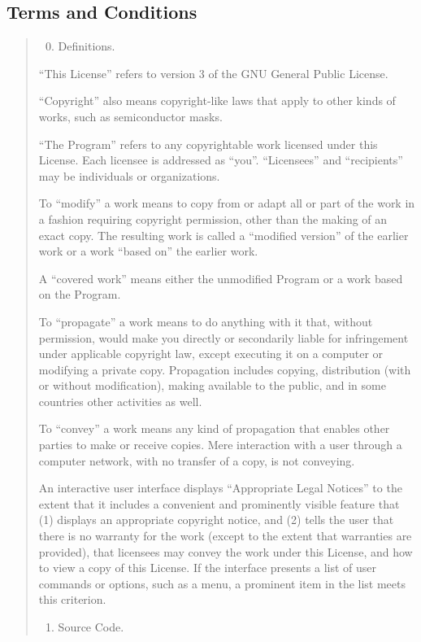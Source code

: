 \documentclass[letterpaper,10pt,english]{sphinxmanual}
\begin{document}
\subsection{Terms and Conditions}
\label{docs/license:terms-and-conditions}\begin{quote}
\begin{enumerate}
\setcounter{enumi}{-1}
\item {} 
Definitions.

\end{enumerate}

``This License'' refers to version 3 of the GNU General Public License.

``Copyright'' also means copyright-like laws that apply to other kinds of
works, such as semiconductor masks.

``The Program'' refers to any copyrightable work licensed under this
License.  Each licensee is addressed as ``you''.  ``Licensees'' and
``recipients'' may be individuals or organizations.

To ``modify'' a work means to copy from or adapt all or part of the work
in a fashion requiring copyright permission, other than the making of an
exact copy.  The resulting work is called a ``modified version'' of the
earlier work or a work ``based on'' the earlier work.

A ``covered work'' means either the unmodified Program or a work based
on the Program.

To ``propagate'' a work means to do anything with it that, without
permission, would make you directly or secondarily liable for
infringement under applicable copyright law, except executing it on a
computer or modifying a private copy.  Propagation includes copying,
distribution (with or without modification), making available to the
public, and in some countries other activities as well.

To ``convey'' a work means any kind of propagation that enables other
parties to make or receive copies.  Mere interaction with a user through
a computer network, with no transfer of a copy, is not conveying.

An interactive user interface displays ``Appropriate Legal Notices''
to the extent that it includes a convenient and prominently visible
feature that (1) displays an appropriate copyright notice, and (2)
tells the user that there is no warranty for the work (except to the
extent that warranties are provided), that licensees may convey the
work under this License, and how to view a copy of this License.  If
the interface presents a list of user commands or options, such as a
menu, a prominent item in the list meets this criterion.
\begin{enumerate}
\item {} 
Source Code.


\end{enumerate}
\end{quote}
\end{document}

